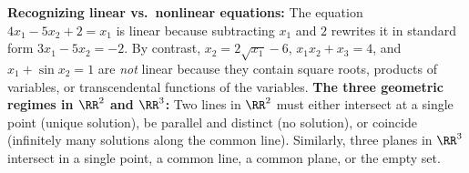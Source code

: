 \documentclass[10pt]{scrartcl}
\begin{document}
\begin{itemize}
  \ii \textbf{Recognizing linear vs.\ nonlinear equations:} The equation $4x_1-5x_2+2=x_1$ is linear because subtracting $x_1$ and $2$ rewrites it in standard form $3x_1-5x_2=-2$. By contrast, $x_2=2\sqrt{x_1}-6$, $x_1x_2+x_3=4$, and $x_1+\sin x_2=1$ are \emph{not} linear because they contain square roots, products of variables, or transcendental functions of the variables.
  \ii \textbf{The three geometric regimes in $\RR^2$ and $\RR^3$:} Two lines in $\RR^2$ must either intersect at a single point (unique solution), be parallel and distinct (no solution), or coincide (infinitely many solutions along the common line). Similarly, three planes in $\RR^3$ intersect in a single point, a common line, a common plane, or the empty set.
\end{itemize}
\end{document}
